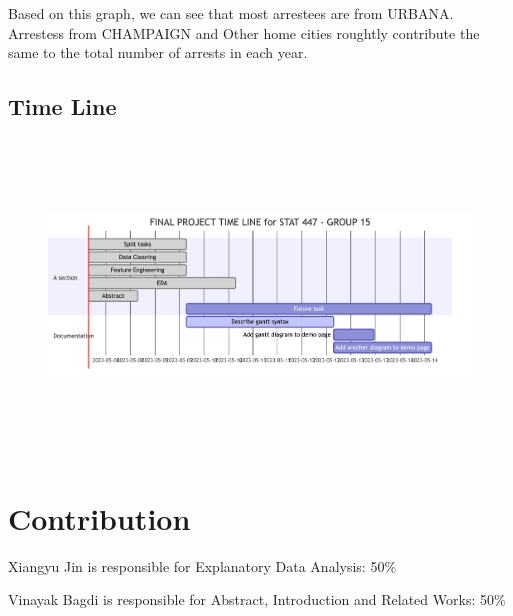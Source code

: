 \documentclass[
  article]{jss}
\begin{document}
Based on this graph, we can see that most arrestees are from URBANA.
Arrestess from CHAMPAIGN and Other home cities roughtly contribute the
same to the total number of arrests in each year.

\hypertarget{time-line}{%
\subsection{Time Line}\label{time-line}}

\begin{figure}[H]

{\centering \includegraphics[width=8.17in,height=3.29in]{progress-report_files/figure-latex/mermaid-figure-1.png}

}

\end{figure}

\hypertarget{contribution}{%
\section{Contribution}\label{contribution}}

Xiangyu Jin is responsible for Explanatory Data Analysis: 50\%

Vinayak Bagdi is responsible for Abstract, Introduction and Related
Works: 50\%


  
\end{document}
